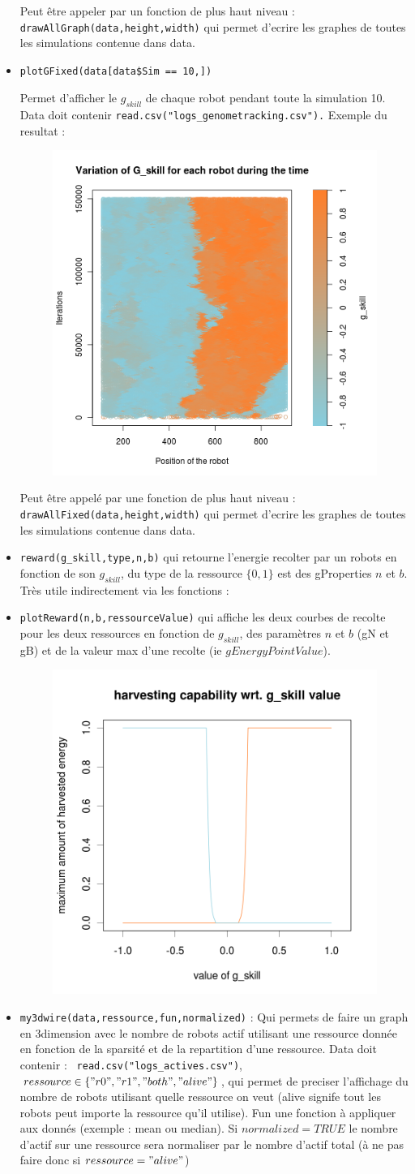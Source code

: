 \documentclass[a4paper,10pt]{report}
\begin{document}
\begin{itemize}
Peut être appeler par un fonction de plus haut niveau : \verb?drawAllGraph(data,height,width)? qui permet d'ecrire les graphes de toutes les simulations contenue dans data.


\item \begin{verbatim}
plotGFixed(data[data$Sim == 10,])
\end{verbatim}
Permet d'afficher le $g_{skill}$ de chaque robot pendant toute la simulation 10. Data doit contenir \verb?read.csv("logs_genometracking.csv").? Exemple du resultat : 
\begin{figure}[H]
\center
\includegraphics[width=.25\textwidth]{../images/5StaticEnv/Gplot58Static_staticEnv1}
\end{figure}

Peut être appelé par une fonction de plus haut niveau : \verb?drawAllFixed(data,height,width)? qui permet d'ecrire les graphes de toutes les simulations contenue dans data.

\item \verb?reward(g_skill,type,n,b)? qui retourne l'energie recolter par un robots en fonction de son $g_{skill}$, du type de la ressource $\{0,1\}$ est des gProperties $n$ et $b$. Très utile indirectement via les fonctions :

\item \verb?plotReward(n,b,ressourceValue)? qui affiche les deux courbes de recolte pour les deux ressources en fonction de $g_{skill}$, des paramètres $n$ et $b$ (gN et gB) et de la valeur max d'une recolte (ie $gEnergyPointValue$).
\begin{figure}[H]
\center
\includegraphics[width=.25\textwidth]{../images/sparsityEffect/f_skill}
\end{figure}


\item \verb?my3dwire(data,ressource,fun,normalized)? : Qui permets de faire un graph en 3dimension avec le nombre de robots actif utilisant une ressource donnée en fonction de la sparsité et de la repartition d'une ressource.
Data doit contenir : \verb? read.csv("logs_actives.csv")?, $ressource \in \{"r0","r1","both","alive"\}$, qui permet de preciser l'affichage du nombre de robots utilisant quelle ressource on veut (alive signife tout les robots peut importe la ressource qu'il utilise). Fun une fonction à appliquer aux donnés (exemple : mean ou median). Si $normalized=TRUE$ le nombre d'actif sur une ressource sera normaliser par le nombre d'actif total (à ne pas faire donc si $ressource="alive"$)


\end{itemize}
\end{document}
